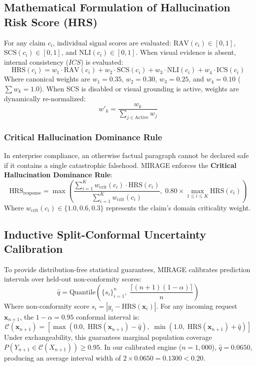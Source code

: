 \documentclass[11pt,a4paper]{article}
\begin{document}
\subsection{Mathematical Formulation of Hallucination Risk Score (HRS)}
For any claim $c_i$, individual signal scores are evaluated: $\text{RAV}(c_i) \in [0, 1]$, $\text{SCS}(c_i) \in [0, 1]$, and $\text{NLI}(c_i) \in [0, 1]$. When visual evidence is absent, internal consistency ($ICS$) is evaluated:
\begin{equation}
\text{HRS}(c_i) = w_1 \cdot \text{RAV}(c_i) + w_2 \cdot \text{SCS}(c_i) + w_3 \cdot \text{NLI}(c_i) + w_4 \cdot \text{ICS}(c_i)
\end{equation}
Where canonical weights are $w_1 = 0.35$, $w_2 = 0.30$, $w_3 = 0.25$, and $w_4 = 0.10$ ($\sum w_k = 1.0$). When SCS is disabled or visual grounding is active, weights are dynamically re-normalized:
\begin{equation}
w'_k = \frac{w_k}{\sum_{j \in \text{Active}} w_j}
\end{equation}

\subsubsection{Critical Hallucination Dominance Rule}
In enterprise compliance, an otherwise factual paragraph cannot be declared safe if it contains a single catastrophic falsehood. MIRAGE enforces the \textbf{Critical Hallucination Dominance Rule}:
\begin{equation}
\text{HRS}_{\text{response}} = \max \left( \frac{\sum_{i=1}^K w_{\text{crit}}(c_i) \cdot \text{HRS}(c_i)}{\sum_{i=1}^K w_{\text{crit}}(c_i)}, \; 0.80 \times \max_{1 \le i \le K} \text{HRS}(c_i) \right)
\end{equation}
Where $w_{\text{crit}}(c_i) \in \{1.0, 0.6, 0.3\}$ represents the claim's domain criticality weight.

\subsection{Inductive Split-Conformal Uncertainty Calibration}
To provide distribution-free statistical guarantees, MIRAGE calibrates prediction intervals over held-out non-conformity scores:
\begin{equation}
\hat{q} = \text{Quantile}\left(\{s_i\}_{i=1}^n, \; \frac{\lceil(n+1)(1-\alpha)\rceil}{n}\right)
\end{equation}
Where non-conformity score $s_i = |y_i - \text{HRS}(\mathbf{x}_i)|$. For any incoming request $\mathbf{x}_{n+1}$, the $1-\alpha = 0.95$ conformal interval is:
\begin{equation}
\mathcal{C}(\mathbf{x}_{n+1}) = \left[ \max(0.0, \; \text{HRS}(\mathbf{x}_{n+1}) - \hat{q}), \; \min(1.0, \; \text{HRS}(\mathbf{x}_{n+1}) + \hat{q}) \right]
\end{equation}
Under exchangeability, this guarantees marginal population coverage $P(Y_{n+1} \in \mathcal{C}(X_{n+1})) \ge 0.95$. In our calibrated engine ($n=1,000$), $\hat{q} = 0.0650$, producing an average interval width of $2 \times 0.0650 = 0.1300 < 0.20$.
\end{document}
